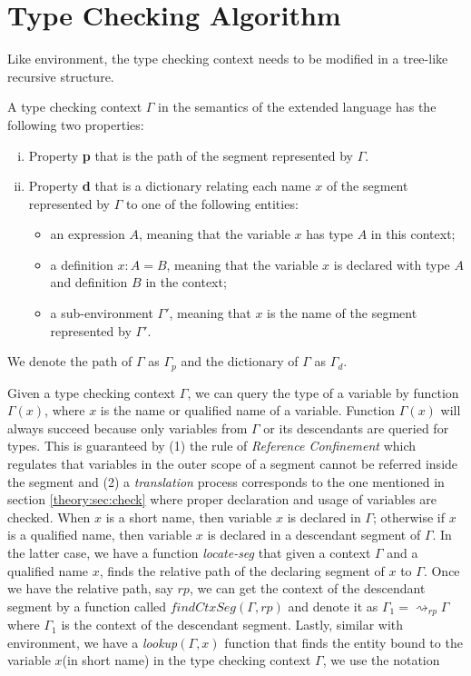 \section{Type Checking Algorithm}
Like environment, the type checking context needs to be modified in a tree-like recursive structure.
\begin{definition}
  A type checking context $\Gamma$ in the semantics of the extended language has the following two properties:
  \begin{enumerate}[(i)]
  \item Property \textbf{p} that is the path of the segment represented by $\Gamma$.
  \item Property \textbf{d} that is a dictionary relating each name $x$ of the segment represented by $\Gamma$ to one of the following entities:
    \begin{itemize}
    \item an expression $A$, meaning that the variable $x$ has type $A$ in this context;
    \item a definition $x : A = B$, meaning that the variable $x$ is declared with type $A$ and definition $B$ in the context;
    \item a sub-environment $\Gamma'$, meaning that $x$ is the name of the segment represented by $\Gamma'$.
    \end{itemize}
  \end{enumerate}
  We denote the path of $\Gamma$ as $\Gamma_{p}$ and the dictionary of $\Gamma$ as $\Gamma_{d}$.
\end{definition}
Given a type checking context $\Gamma$, we can query the type of a variable by function $\Gamma(x)$, where $x$ is the name or qualified name of a variable. Function $\Gamma(x)$ will always succeed because only variables from $\Gamma$ or its descendants are queried for types. This is guaranteed by (1) the rule of \emph{Reference Confinement} which regulates that variables in the outer scope of a segment cannot be referred inside the segment and (2) a \emph{translation} process corresponds to the one mentioned in section \ref{theory:sec:check} where proper declaration and usage of variables are checked. When $x$ is a short name, then variable $x$ is declared in $\Gamma$; otherwise if $x$ is a qualified name, then variable $x$ is declared in a descendant segment of $\Gamma$. In the latter case, we have a function \emph{locate-seg} that given a context $\Gamma$ and a qualified name $x$, finds the relative path of the declaring segment of $x$ to $\Gamma$. Once we have the relative path, say $rp$, we can get the context of the descendant segment by a function called $findCtxSeg(\Gamma, rp)$ and denote it as $\Gamma_1 = \rightsquigarrow_{rp}\Gamma$ where $\Gamma_1$ is the context of the descendant segment. Lastly, similar with environment, we have a \emph{lookup}$(\Gamma, x)$ function that finds the entity bound to the variable $x$(in short name) in the type checking context $\Gamma$, we use the notation
